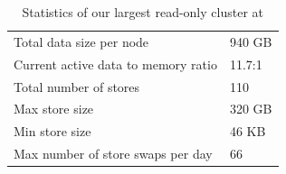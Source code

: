 \begin{table}
\begin{center}
	\begin{tabular} { | l | l | }
	\hline
	Total data size per node &	940 GB			\\ 
	Current active data to memory ratio &	11.7:1		\\
	\hline
	Total number of stores &	110 	\\
	Max store size  &		320 GB	\\
	Min store size &		46 KB	\\
	Max number of store swaps per day & 66	\\
	\hline
	\end{tabular}
\end{center}
	\caption{Statistics of our largest read-only cluster at \linkedin{}}
 	\label{tab:production_statistics}
\end{table}


